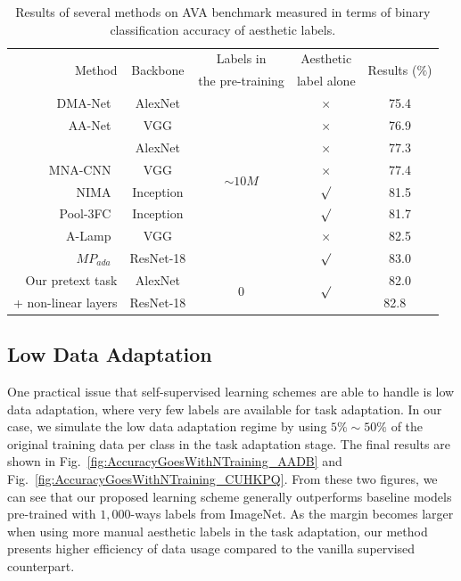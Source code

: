 \documentclass[letterpaper]{article}
\begin{document}
\begin{table}
    \centering
    \footnotesize{
    \caption{Results of several methods on AVA benchmark measured in terms of binary classification accuracy of aesthetic labels.}
    \label{Tab:ResultsOnAVA_VSFS}
    \begin{tabular}{r|cccc}
    	\toprule
    	\multirow{2}{*}{Method} & \multirow{2}{*}{Backbone} & Labels in & Aesthetic & \multirow{2}{*}{Results ($\%$)} \\
    	 & & the pre-training & label alone & \\
    	\hline
    	DMA-Net~\cite{lu2015deep}            & AlexNet & \multirow{8}{*}{$\sim 10M$} & $\times$ & 75.4 \\
    	AA-Net~\cite{wang2017deep}               & VGG & & $\times$ & 76.9 \\
    	~\cite{kong2016photo}                    & AlexNet & & $\times$ & 77.3 \\
    	MNA-CNN~\cite{mai2016composition}  & VGG & & $\times$ & 77.4 \\
    	NIMA~\cite{talebi2018nima}               & Inception & & $\surd$ & 81.5 \\
    	Pool-3FC~\cite{hosu2019effective}        & Inception & & $\surd$ & 81.7 \\
    	A-Lamp~\cite{ma2017lamp}                 & VGG & & $\times$ & 82.5 \\
    	$MP_{ada}$~\cite{sheng2018attention}     & ResNet-18 & & $\surd$ & 83.0 \\
    	\hline
    	Our pretext task & AlexNet & \multirow{2}{*}{0} & \multirow{2}{*}{$\surd$} & 82.0 \\
    	+ non-linear layers & ResNet-18 & & & 82.8 \ \\
    	\bottomrule
    \end{tabular}
    }
\end{table}

\subsection{Low Data Adaptation}
One practical issue that self-supervised learning schemes are able to handle is low data adaptation, where very few labels are available for task adaptation.
In our case, we simulate the low data adaptation regime by using $5\% \sim 50\%$ of the original training data per class in the task adaptation stage.
The final results are shown in Fig.~\ref{fig:AccuracyGoesWithNTraining_AADB} and Fig.~\ref{fig:AccuracyGoesWithNTraining_CUHKPQ}.
From these two figures, we can see that our proposed learning scheme generally outperforms baseline models pre-trained with $1,000$-ways labels from ImageNet.
As the margin becomes larger when using more manual aesthetic labels in the task adaptation, our method presents higher efficiency of data usage compared to the vanilla supervised counterpart.
\end{document}
